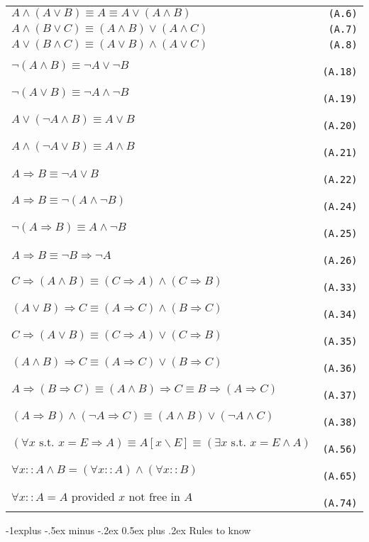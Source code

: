 \documentclass[10pt,landscape]{article}
\makeatletter
\renewcommand{\subsection}{\@startsection{subsection}{2}{0mm}%
                                {-1explus -.5ex minus -.2ex}%
                                {0.5ex plus .2ex}%
                                {\normalfont\normalsize\bfseries}}
\newcommand{\imp}{\Rightarrow}
\makeatother
\begin{document}
\begin{multicols}{3}
\begin{tabular}{@{}ll@{}}
$ A \land (A \lor B) \equiv A \equiv A \lor (A \land B)$ & \verb! (A.6)! \\
$ A \land (B \lor C) \equiv (A \land B) \lor (A \land C)$ & \verb! (A.7)! \\
$ A \lor (B \land C) \equiv (A \lor B) \land (A \lor C)$ & \verb! (A.8)! \\
$ \neg (A \land B) \equiv \neg A \lor \neg B$ & \verb! (A.18)! \\
$ \neg (A \lor B) \equiv \neg A \land \neg B$ & \verb! (A.19)! \\
$ A \lor (\neg A \land B) \equiv A \lor B$ & \verb! (A.20)! \\
$ A \land (\neg A \lor B) \equiv A \land B$ & \verb! (A.21)! \\
$ A \Rightarrow B \equiv \neg A \lor B$ & \verb! (A.22)! \\
$ A \Rightarrow B \equiv \neg(A \land \neg B)$ & \verb! (A.24)! \\
$ \neg(A \Rightarrow B) \equiv A \land \neg B$ & \verb! (A.25)! \\
$ A \Rightarrow B \equiv \neg B \Rightarrow \neg A$ & \verb! (A.26)! \\
$ C \imp (A \land B) \equiv (C \imp A) \land (C \imp B)$ & \verb! (A.33)! \\
$ (A \lor B) \imp C \equiv (A \imp C) \land (B \imp C)$ & \verb! (A.34)! \\
$ C \imp (A \lor B) \equiv (C \imp A) \lor (C \imp B)$ & \verb! (A.35)! \\
$ (A \land B) \imp C \equiv (A \imp C) \lor (B \imp C)$ & \verb! (A.36)! \\
$ A \imp (B \imp C) \equiv (A \land B) \imp C \equiv B \imp (A \imp C)$ & \verb! (A.37)! \\
$ (A \imp B) \land (\neg A \imp C) \equiv (A \land B) \lor (\neg A \land C)$ & \verb! (A.38)! \\
$ (\forall x \text{ s.t. } x = E \imp A) \equiv A[x \backslash E] \equiv (\exists x \text{ s.t. } x = E \land A)$ & \verb! (A.56)! \\
$ \forall x :: A \land B = (\forall x :: A) \land (\forall x :: B)$ & \verb! (A.65)! \\
$ \forall x :: A = A \text{ provided } x \text{ not free in } A$ & \verb! (A.74)! \\
\end{tabular}

\subsection{Rules to know}


\end{multicols}
\end{document}
